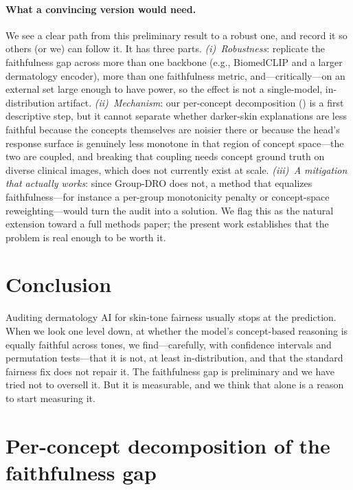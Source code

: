 \documentclass[pmlr,twocolumn,10pt]{jmlr}
\begin{document}
\paragraph{What a convincing version would need.}
We see a clear path from this preliminary result to a robust one, and record it
so others (or we) can follow it. It has three parts. \emph{(i)~Robustness}:
replicate the faithfulness gap across more than one backbone (e.g.,
BiomedCLIP and a larger dermatology encoder), more than one faithfulness metric,
and---critically---on an external set large enough to have power, so the effect
is not a single-model, in-distribution artifact. \emph{(ii)~Mechanism}: our per-concept
decomposition () is a first descriptive step, but it cannot
separate whether darker-skin explanations are less faithful because the concepts
themselves are noisier there or because the head's response surface is genuinely
less monotone in that region of concept space---the two are coupled, and
breaking that coupling needs concept ground truth on diverse clinical images,
which does not currently exist at scale. \emph{(iii)~A mitigation that actually works}: since Group-DRO does
not, a method that equalizes faithfulness---for instance a per-group
monotonicity penalty or concept-space reweighting---would turn the audit into a
solution. We flag this as the natural extension toward a full methods paper; the
present work establishes that the problem is real enough to be worth it.

\section{Conclusion}

Auditing dermatology AI for skin-tone fairness usually stops at the prediction.
When we look one level down, at whether the model's concept-based reasoning is
equally faithful across tones, we find---carefully, with confidence intervals
and permutation tests---that it is not, at least in-distribution, and that the
standard fairness fix does not repair it. The faithfulness gap is preliminary
and we have tried not to oversell it. But it is measurable, and we think that
alone is a reason to start measuring it.




\appendix

\section{Per-concept decomposition of the faithfulness gap}
\label{sec:mech}
\end{document}
